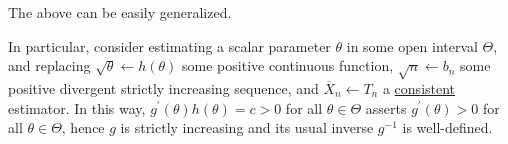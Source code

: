 \begin{remark}
	The above can be easily generalized.
\end{remark}
\begin{explanation}
	In particular, consider estimating a scalar parameter \(\theta \) in some open interval \(\Theta \), and replacing \(\sqrt{\theta } \gets h(\theta )\) some positive continuous function, \(\sqrt{n} \gets b_n\) some positive divergent strictly increasing sequence, and \(\overline{X} _n \gets T_n\) a \hyperref[def:consistent]{consistent} estimator. In this way, \(g^{\prime} (\theta ) h(\theta ) = c > 0\) for all \(\theta \in \Theta \) asserts \(g^{\prime} (\theta ) > 0\) for all \(\theta \in \Theta \), hence \(g\) is strictly increasing and its usual inverse \(g^{-1} \) is well-defined.
\end{explanation}